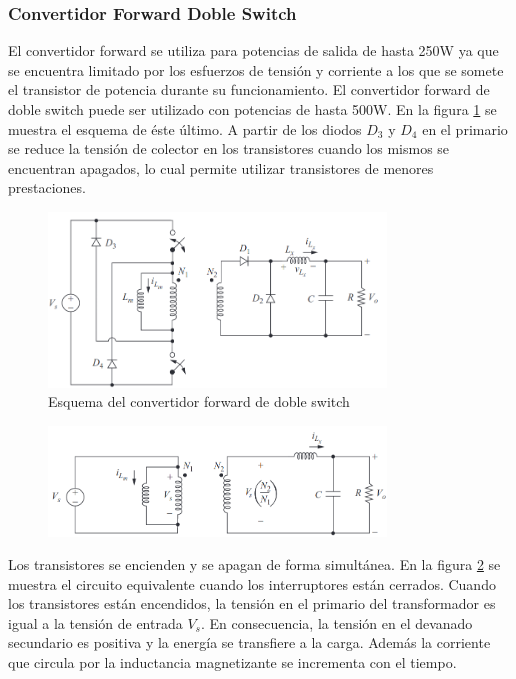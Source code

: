 \subsubsection{Convertidor Forward Doble Switch}

El convertidor forward se utiliza para potencias de salida de hasta 250W ya que se encuentra limitado 
por los esfuerzos de tensión y corriente a los que se somete el transistor de potencia durante su funcionamiento. 
El convertidor forward de doble switch puede ser utilizado con potencias de hasta 500W.
En la figura \ref{fig:forward_doble_switch} se muestra el esquema de éste último.
A partir de los diodos $D_3$ y $D_4$ en el primario se reduce la tensión de colector en los transistores cuando los mismos 
se encuentran apagados, lo cual permite utilizar transistores de menores prestaciones.

\begin{figure}[H]
    \centering
    \includegraphics[width=0.8\textwidth]{../images/hart/forward_doble_switch.png}
    \caption{Esquema del convertidor forward de doble switch}
    \label{fig:forward_doble_switch}
\end{figure}

\begin{figure}[H]
    \centering
    \includegraphics[width=0.8\textwidth]{images/hart/forward_doble_switch_closed.png}
    \caption{}
    \label{fig:forward_doble_switch_closed}
\end{figure}

Los transistores se encienden y se apagan de forma simultánea. 
En la figura \ref{fig:forward_doble_switch_closed} se muestra el circuito equivalente cuando los interruptores están cerrados.  
Cuando los transistores están encendidos, la tensión en el primario del transformador es igual a la tensión de entrada $V_s$. 
En consecuencia, la tensión en el devanado secundario es positiva y la energía se transfiere a la carga. 
Además la corriente que circula por la inductancia magnetizante se incrementa con el tiempo. 


